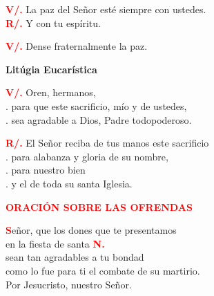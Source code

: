 \documentclass[12pt, letterpaper]{report}
\begin{document}
\noindent
\Large {\bfseries \textcolor{red}{V/.}} \hspace{0.5cm} La paz del Se\~nor est\'e siempre con ustedes. \\
\Large {\bfseries \textcolor{red}{R/.}} \hspace{0.5cm} Y con tu esp\'iritu. \newline

\noindent
\Large {\bfseries \textcolor{red}{V/.}} \hspace{0.5cm} Dense fraternalmente la paz. \newline

\newpage

\begin{center}
\Huge {\bfseries Lit\'ugia Eucar\'istica}
\end{center}

\noindent
\Large {\bfseries \textcolor{red}{V/.}} \hspace{0.5cm} Oren, hermanos, \\
. \hspace{1.5cm} para que este sacrificio, m\'io y de ustedes, \\
. \hspace{1.5cm} sea agradable a Dios, Padre todopoderoso. \newline

\noindent
\Large {\bfseries \textcolor{red}{R/.}} \hspace{0.5cm} El Se\~nor reciba de tus manos este sacrificio \\
. \hspace{1.5cm} para alabanza y gloria de su nombre, \\
. \hspace{1.5cm} para nuestro bien \\
. \hspace{1.5cm} y el de toda su santa Iglesia. \newline

\Large {\bfseries \textcolor{red}{ORACI\'ON SOBRE LAS OFRENDAS}}

\lettrine[lines=1]{\bfseries \textcolor{red}{S}}{}\Large e\~nor, que los dones que te presentamos \\
en la fiesta de santa {\bfseries \textcolor{red}{N.}} \\
sean tan agradables a tu bondad \\
como lo fue para ti el combate de su martirio. \\
Por Jesucristo, nuestro Se\~nor. \newline
\end{document}
